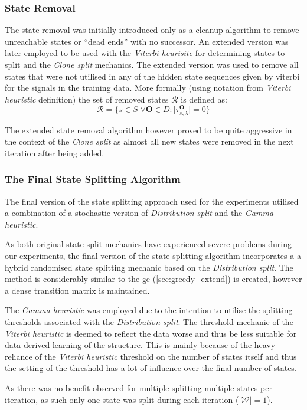 \subsubsection{State Removal}
The state removal was initially introduced only as a cleanup algorithm to remove unreachable states or ``dead ends'' with no successor. An extended version was later employed to be used with the \emph{Viterbi heurisitc} for determining states to split and the \emph{Clone split} mechanics. The extended version was used to remove all states that were not utilised in any of the hidden state sequences given by \gls{viterbi} for the signals in the training data. More formally (using notation from \emph{Viterbi heuristic} definition) the set of removed states $\mathcal{R}$ is defined as:
$$\mathcal{R}=\{s\in S|\forall\mathbf{O}\in D: |\tau_{s,\lambda}^\mathbf{O}|=0\}$$

The extended state removal algorithm however proved to be quite aggressive in the context of the \emph{Clone split} as almost all new states were removed in the next iteration after being added.

\subsubsection{The Final State Splitting Algorithm}
The final version of the state splitting approach used for the experiments utilised a combination of a stochastic version of \emph{Distribution split} and the \emph{Gamma heuristic}.

As both original state split mechanics have experienced severe problems during our experiments, the final version of the state splitting algorithm incorporates a a hybrid randomised state splitting mechanic based on the \emph{Distribution split}. The method is considerably similar to the \acrlong{ge} (\ref{sec:greedy_extend}) is created, however a dense transition matrix is maintained.

The \emph{Gamma heuristic} was employed due to the intention to utilise the splitting thresholds associated with the \emph{Distribution split}. The threshold mechanic of the \emph{Viterbi heuristic} is deemed to reflect the data worse and thus be less suitable for data derived learning of the structure. This is mainly because of the heavy reliance of the \emph{Viterbi heuristic} threshold on the number of states itself and thus the setting of the threshold has a lot of influence over the final number of states.

As there was no benefit observed for multiple splitting multiple states per iteration, as such only one state was split during each iteration ($|\mathcal{W}| = 1$).

